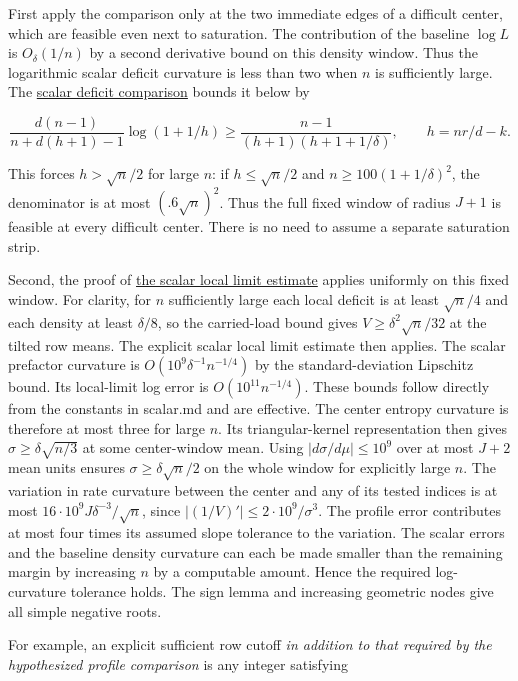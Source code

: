 \documentclass[11pt]{article}
\begin{document}
First apply the comparison only at the two immediate edges of a
difficult center, which are feasible even next to saturation. The
contribution of the baseline $\log L$ is $O_\delta(1/n)$ by a second
derivative bound on this density window. Thus the logarithmic scalar
deficit curvature is less than two when $n$ is sufficiently large.
The \href{https://github.com/ProgramComputer/open-math-research/blob/main/topics/balanced-arrays/adjacent-quotas/README.md}{scalar deficit comparison}
bounds it below by

\[
\frac{d(n-1)}{n+d(h+1)-1}\log(1+1/h)
\ge \frac{n-1}{(h+1)(h+1+1/\delta)},
\qquad h=nr/d-k.
\]

This forces $h>\sqrt n/2$ for large $n$: if $h\le\sqrt n/2$ and
$n\ge100(1+1/\delta)^2$, the denominator is at most $(.6\sqrt n)^2$.
Thus the full fixed window of radius $J+1$ is feasible at every
difficult center. There is no need to assume a separate saturation strip.

Second, the proof of \href{https://github.com/ProgramComputer/open-math-research/blob/main/topics/balanced-arrays/adjacent-quotas/scalar.md}{the scalar local limit estimate} applies uniformly on this
fixed window. For clarity, for $n$ sufficiently large each local
deficit is at least $\sqrt n/4$ and each density at least $\delta/8$,
so the carried-load bound gives $V\ge\delta^2\sqrt n/32$ at the tilted
row means. The explicit scalar local limit estimate then applies.
The scalar prefactor curvature is $O(10^9\delta^{-1}n^{-1/4})$ by
the standard-deviation Lipschitz bound. Its local-limit log error is
$O(10^{11}n^{-1/4})$. These bounds follow directly from the constants
in scalar.md and are effective. The center entropy curvature is
therefore at most three for large $n$. Its triangular-kernel
representation then gives $\sigma\ge\delta\sqrt{n/3}$ at some
center-window mean. Using $|d\sigma/d\mu|\le10^9$ over at most $J+2$
mean units ensures $\sigma\ge\delta\sqrt n/2$ on the whole window
for explicitly large $n$. The variation in rate curvature between
the center and any of its tested indices is at most
$16\cdot10^9J\delta^{-3}/\sqrt n$, since
$|(1/V)'|\le2\cdot10^9/\sigma^3$. The profile error contributes
at most four times its assumed slope tolerance to the variation.
The scalar errors and the baseline density curvature can each be
made smaller than the remaining margin by increasing $n$ by a
computable amount. Hence the required log-curvature tolerance holds.
The sign lemma and increasing geometric nodes give all simple
negative roots.

For example, an explicit sufficient row cutoff \emph{in addition to that
required by the hypothesized profile comparison} is any integer satisfying
\end{document}
